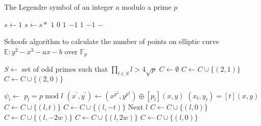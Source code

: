 \begin{algorithm} \label{legendresymbol}
	\caption{The Legendre symbol of an integer $a$ modulo a prime $p$}
	\begin{algorithmic}[1]
			\State $s \leftarrow 1 $
				\State $s \leftarrow s * $
			\EndFor
			  		\State \Return $1$
			  		\State \Return $0$ 
			  			\State \Return $1$
			  		\Else
			  			\State \Return $-1$
			  		\EndIf
			  			\State \Return $1$
			  		\Else
			  			\State \Return $-1$
			  		\EndIf 
			  		\State \Return {} 
			  		\State \Return {}
			  	\Else
			  		\State \Return $-$
			  	\EndIf
		  	\EndFunction
		  	\State {}
		\EndFunction
	\end{algorithmic} 
\end{algorithm} 

\begin{algorithm} \label{schoof}
	\caption{Schoofs algorithm to calculate the number of points on elliptic curve $\mathbb{E} : y^2 - x^3 - ax - b$ over $\mathbb{F}_p$}
	\begin{algorithmic}[1]
			\State $S \leftarrow $ set of odd primes such that $\prod_{l \in S}l > 4\sqrt{p}$  
			\State $C \leftarrow \emptyset $
				\State $C \leftarrow C \cup \lbrace (2,1) \rbrace $
			\Else 
				\State $C \leftarrow C \cup \lbrace (2,0) \rbrace $
			\EndIf

				\State $\psi_l \leftarrow $  
				\State $p_l = p \text{ mod } l$
				\State $(x^\prime,y^\prime) \leftarrow (x^{p^2},y^{p^2}) \oplus [p_l](x,y) $ 
					\State $(x_{t},y_{t}) = [t](x,y)$
							\State $C \leftarrow C \cup \lbrace (l,t) \rbrace $
						\Else
							\State $C \leftarrow C \cup \lbrace (l,-t) \rbrace $
						\EndIf
						\State Next $l$
					\EndIf
				\EndFor 
						\State $C \leftarrow C \cup \lbrace (l,0) \rbrace $
					\Else
							\State $C \leftarrow C \cup \lbrace (l,-2w) \rbrace $
						\Else
							\State $C \leftarrow C \cup \lbrace (l,2w) \rbrace $
						\EndIf 
					\EndIf
				\Else
					\State $C \leftarrow C \cup \lbrace (l,0) \rbrace $
				\EndIf 
			\EndFor 
			\State {} 
	  	\EndFunction
	\end{algorithmic} 
\end{algorithm} 

